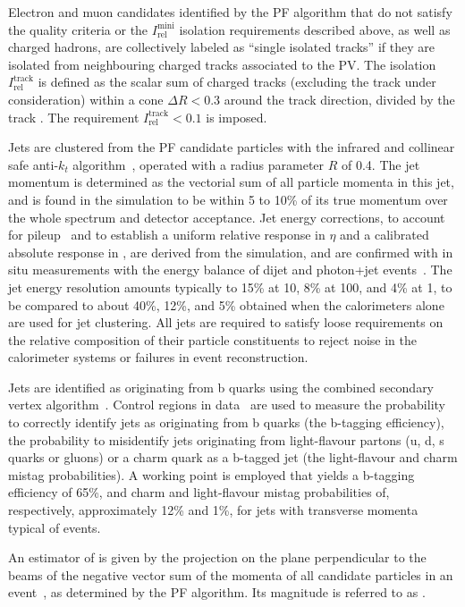Electron and muon candidates identified by the PF algorithm that do
not satisfy the quality criteria or the $I^\text{mini}_\text{rel}$
isolation requirements described above, as well as charged hadrons,
are collectively labeled as ``single isolated tracks'' if they are
isolated from neighbouring charged tracks associated to the PV. The
isolation $I^\text{track}_\text{rel}$ is defined as the scalar \Pt sum
of charged tracks (excluding the track under consideration) within a
cone $\Delta R < 0.3$ around the track direction, divided by the track
\Pt. The requirement $I^\text{track}_\text{rel} < 0.1$ is imposed.

Jets are clustered from the PF candidate particles with the infrared
and collinear safe anti-$k_t$ algorithm~\cite{antikt}, operated with a
radius parameter $R$ of 0.4. The jet momentum is determined as the
vectorial sum of all particle momenta in this jet, and is found in the
simulation to be within 5 to 10\% of its true momentum over the whole
\pt spectrum and detector acceptance. Jet energy corrections, to
account for pileup~\cite{pileup} and to establish a uniform relative
response in $\eta$ and a calibrated absolute response in \Pt, are
derived from the simulation, and are confirmed with in situ
measurements with the energy balance of dijet and photon+jet
events~\cite{Chatrchyan:2011ds}. The jet energy resolution amounts
typically to 15\% at 10\GeV, 8\% at 100\GeV, and 4\% at 1\TeV, to be
compared to about 40\%, 12\%, and 5\% obtained when the calorimeters
alone are used for jet clustering.
All jets are required to satisfy loose requirements on the relative
composition of their particle constituents to reject noise in the
calorimeter systems or failures in event reconstruction.

Jets are identified as originating from b quarks using the combined
secondary vertex algorithm~\cite{CMS-PAS-BTV-12-001}. Control regions
in data~\cite{bjets} are used to measure the probability to correctly
identify jets as originating from b quarks (the b-tagging efficiency),
the probability to misidentify jets originating from light-flavour
partons (u, d, s quarks or gluons) or a charm quark as a b-tagged jet
(the light-flavour and charm mistag probabilities). A working point is
employed that yields a b-tagging efficiency of 65\%, and charm and
light-flavour mistag probabilities of, respectively, approximately
12\% and 1\%, for jets with transverse momenta typical of \ttbar
events.

An estimator of \ptvecmiss is given by the projection on the plane
perpendicular to the beams of the negative vector sum of the momenta
of all candidate particles in an event~\cite{cms-met}, as determined
by the PF algorithm. Its magnitude is referred to as \ETmiss.


